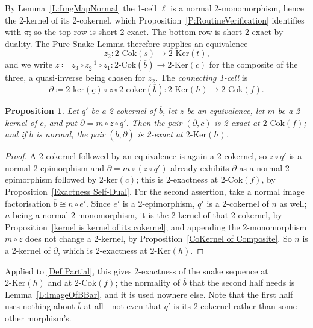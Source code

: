 \documentclass[reqno,a4paper]{amsart}
\numberwithin{equation}{section}
\theoremstyle{plain}
\newtheorem{proposition}[subsection]{Proposition}
\theoremstyle{definition}
\def\nameit#1{\textrm{#1}~}
\def\prox{\nameit{Proposition}}
\def\lemx{\nameit{Lemma}}
\def\dfn#1{{\itshape #1}}
\newcommand{\comp}{\circ}
\newcommand{\iso}{\cong}
\newcommand{\ov}[1]{\overline{#1}}
\renewcommand{\1}{\onecat{1}}
\newcommand{\TwoKer}{\ensuremath{2\text{-}\mathrm{Ker}}}
\newcommand{\TwoCoker}{\ensuremath{2\text{-}\mathrm{Cok}}}
\newcommand{\twoker}{\ensuremath{2\text{-}\mathrm{ker}}}
\newcommand{\twocoker}{\ensuremath{2\text{-}\mathrm{coker}}}
\begin{document}
By \lemx\ref{L:ImgMapNormal} the 1-cell \(\ell\) is a normal 2-monomorphism, hence the 2-kernel of its 2-cokernel, which \prox\ref{P:RoutineVerification} identifies with \(\pi\); so the top row is short 2-exact. The bottom row is short 2-exact by duality. The Pure Snake Lemma therefore supplies an equivalence
\[
	z_2\colon\TwoCoker(s)\longrightarrow\TwoKer(t)\text{,}
\]
and we write \(z\coloneq z_3\comp z_2^{-1}\comp z_1\colon\TwoCoker(\ov{b})\to\TwoKer(\underline{c})\) for the composite of the three, a quasi-inverse being chosen for \(z_2\). The \dfn{connecting 1-cell} is
\begin{equation}\label{Def Partial}
	\partial\coloneq\twoker(\underline{c})\comp z\comp\twocoker(\ov{b})\colon\TwoKer(h)\longrightarrow\TwoCoker(f)\text{.}
\end{equation}

\begin{proposition}\label{P:Shape}
	Let \(q'\) be a 2-cokernel of \(\ov{b}\), let \(z\) be an equivalence, let \(m\) be a 2-kernel of \(\underline{c}\), and put \(\partial=m\comp z\comp q'\). Then the pair \((\partial,\underline{c})\) is 2-exact at \(\TwoCoker(f)\); and if \(\ov{b}\) is normal, the pair \((\ov{b},\partial)\) is 2-exact at \(\TwoKer(h)\).
\end{proposition}
\begin{proof}
	A 2-cokernel followed by an equivalence is again a 2-cokernel, so \(z\comp q'\) is a normal 2-epimorphism and \(\partial=m\comp(z\comp q')\) already exhibits \(\partial\) as a normal 2-epimorphism followed by \(\twoker(\underline{c})\); this is 2-exactness at \(\TwoCoker(f)\), by \prox\ref{Exactness Self-Dual}. For the second assertion, take a normal image factorisation \(\ov{b}\iso n\comp e'\). Since \(e'\) is a 2-epimorphism, \(q'\) is a 2-cokernel of \(n\) as well; \(n\) being a normal 2-monomorphism, it is the 2-kernel of that 2-cokernel, by \prox\ref{kernel is kernel of its cokernel}; and appending the 2-monomorphism \(m\comp z\) does not change a 2-kernel, by \prox\ref{CoKernel of Composite}. So \(n\) is a 2-kernel of \(\partial\), which is 2-exactness at \(\TwoKer(h)\).
\end{proof}

Applied to \eqref{Def Partial}, this gives 2-exactness of the snake sequence at \(\TwoKer(h)\) and at \(\TwoCoker(f)\); the normality of \(\ov{b}\) that the second half needs is \lemx\ref{L:ImageOfBBar}, and it is used nowhere else. Note that the first half uses nothing about \(\ov{b}\) at all---not even that \(q'\) is its 2-cokernel rather than some other morphism's.
\end{document}
